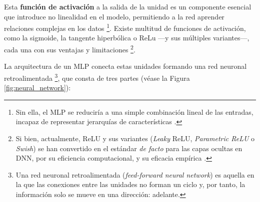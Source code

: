 Esta \textbf{función de activación} a la salida de la unidad es un componente esencial que introduce no 
linealidad en el modelo, permitiendo a la red aprender relaciones complejas en los datos%
\footnote{
    Sin ella, el \acrshort{MLP} se reduciría a una simple combinación lineal de las entradas, incapaz de
    representar jerarquías de características \cite{murphy2022}.
}.
Existe multitud de funciones de activación, como la sigmoide, la tangente hiperbólica o ReLu ---y sus 
múltiples variantes---, cada una con sus ventajas y limitaciones%
\footnote{
    Si bien, actualmente, ReLU y sus variantes (\textit{Leaky} ReLU, \textit{Parametric ReLU} o 
    \textit{Swish}) se han convertido en el estándar \textit{de facto} para las capas ocultas en \acrshort{DNN},
    por su eficiencia computacional, y su eficacia empírica \cite{vargas2021}.
}.

La arquitectura de un \acrshort{MLP} conecta estas unidades formando una red neuronal retroalimentada%
\footnote{
    Una red neuronal retroalimentada (\textit{feed-forward neural network}) es aquella en la que las 
    conexiones entre las unidades no forman un ciclo y, por tanto, la información solo se mueve en una 
    dirección: adelante.
},
que consta de tres partes (véase la Figura \ref{fig:neural_network}):


